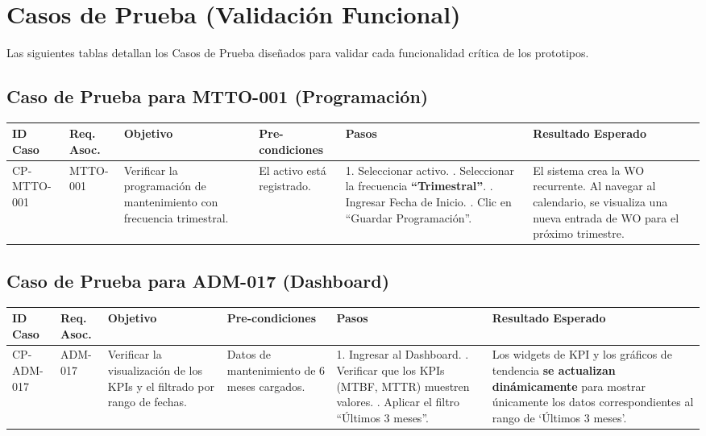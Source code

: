 \section{Casos de Prueba (Validación Funcional)}

Las siguientes tablas detallan los Casos de Prueba diseñados para validar cada funcionalidad crítica de los prototipos.

\subsection{Caso de Prueba para MTTO-001 (Programación)}

\footnotesize
\begin{longtable}{|p{2cm}|p{2cm}|p{3cm}|p{2.5cm}|p{3cm}|p{3cm}|}
\hline
\textbf{ID Caso} & \textbf{Req. Asoc.} & \textbf{Objetivo} & \textbf{Pre-condiciones} & \textbf{Pasos} & \textbf{Resultado Esperado} \\ \hline
CP-MTTO-001 & MTTO-001 & Verificar la programación de mantenimiento con frecuencia trimestral. & El activo está registrado. & 1. Seleccionar activo. \newline 2. Seleccionar la frecuencia \textbf{``Trimestral''}. \newline 3. Ingresar Fecha de Inicio. \newline 4. Clic en ``Guardar Programación''. & El sistema crea la WO recurrente. Al navegar al calendario, se visualiza una nueva entrada de WO para el próximo trimestre. \\ \hline
\end{longtable}
\normalsize

\subsection{Caso de Prueba para ADM-017 (Dashboard)}

\footnotesize
\begin{longtable}{|p{2cm}|p{2cm}|p{3cm}|p{2.5cm}|p{3cm}|p{3cm}|}
\hline
\textbf{ID Caso} & \textbf{Req. Asoc.} & \textbf{Objetivo} & \textbf{Pre-condiciones} & \textbf{Pasos} & \textbf{Resultado Esperado} \\ \hline
CP-ADM-017 & ADM-017 & Verificar la visualización de los KPIs y el filtrado por rango de fechas. & Datos de mantenimiento de 6 meses cargados. & 1. Ingresar al Dashboard. \newline 2. Verificar que los KPIs (MTBF, MTTR) muestren valores. \newline 3. Aplicar el filtro ``Últimos 3 meses''. & Los widgets de KPI y los gráficos de tendencia \textbf{se actualizan dinámicamente} para mostrar únicamente los datos correspondientes al rango de `Últimos 3 meses'. \\ \hline
\end{longtable}
\normalsize

